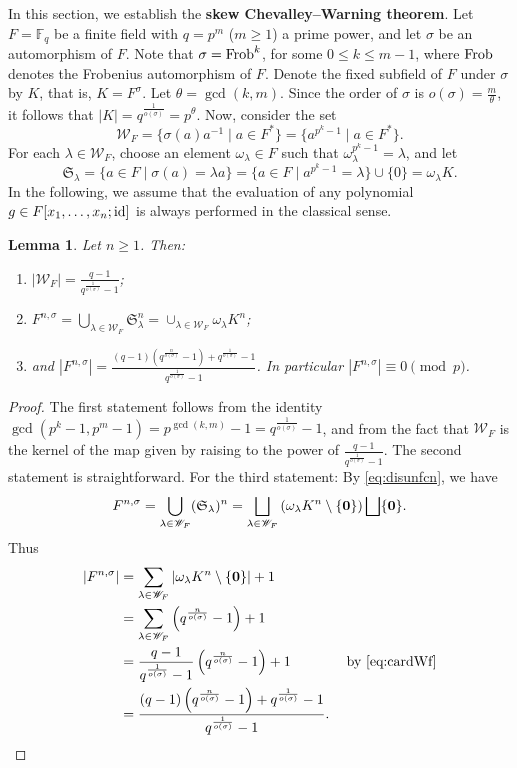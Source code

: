 \documentclass[11pt,reqno]{amsart}
\newtheorem{lem}[thm]{Lemma}
\theoremstyle{definition}
\begin{document}
In this section, we establish the {\bf skew Chevalley--Warning theorem}. Let $F=\mathbb{F}_q$ be a finite field with $q=p^m$ ($m \geq 1$) a prime power, and let $\sigma$ be an automorphism of $F$. Note that $\sigma={\rm Frob}^k$, for some $0 \leq k \leq m-1$, where ${\rm Frob}$ denotes the Frobenius automorphism of $F$.  Denote the fixed subfield of $F$ under $\sigma$ by $K$, that is, $K=F^\sigma$. Let $\theta=\gcd(k,m)$. Since the order of $\sigma$ is $o(\sigma)=\frac{m}{\theta}$, it follows that $|K|=q^{\frac{1}{o(\sigma)}}=p^{\theta}$. Now, consider the set 
$$\mathscr{W}_F=\{\sigma(a)a^{-1} \mid a \in F^*\}=\{a^{p^k-1}\mid a \in F^*\}.$$ 
For each $\lambda \in \mathscr{W}_F$, choose an element $\omega_\lambda \in F$ such that $\omega_\lambda^{p^k-1}=\lambda$, and let 
$$\mathfrak{S}_\lambda=\{a \in F \mid \sigma(a)=\lambda a\}=\{a \in F \mid a^{p^k-1}=\lambda\} \cup \{0\}=\omega_\lambda K.$$
{ In the following, we assume that the evaluation of any polynomial $g \in F[x_1,\dots,x_n;{\rm id}]$ is always performed in the classical sense.}
\begin{lem}\label{lem:carfcn}
Let $n \geq 1$. Then:
\begin{enumerate}
\item $|\mathscr{W}_F|=\frac{q-1}{q^{\frac{1}{o(\sigma)}}-1}$; \label{eq:cardWf}
\item $F^{n,\sigma}=\bigcup_{\lambda \in \mathscr{W}_F}\mathfrak{S}_\lambda ^n =\cup_{\lambda \in \mathscr{W}_F}\omega_\lambda K^n$;\label{eq:disunfcn}
\item and $|F^{n,\sigma}|=\frac{(q-1)\left(q^{\frac{n}{o(\sigma)}}-1\right)+q^{\frac{1}{o(\sigma)}}-1}{q^{\frac{1}{o(\sigma)}}-1}$. In particular $|F^{n,\sigma}| \equiv 0\pmod{p}$.
\end{enumerate}
\end{lem}
\begin{proof}
The first statement follows from the identity $\gcd(p^k-1,p^m-1)=p^{\gcd(k,m)}-1=q^{\frac{1}{o(\sigma)}}-1$, and from the fact that $\mathscr{W}_F$ is the kernel of the map given by raising to the power of $\frac{q-1}{q^{\frac{1}{o(\sigma)}}-1}$. The second statement is straightforward. For the third statement: By \eqref{eq:disunfcn}, we have 
$$F^{n,\sigma}=\bigcup_{\lambda \in \mathscr{W}_F}(\mathfrak{S}_\lambda )^n=\bigsqcup_{\lambda \in \mathscr{W}_F}\left(\omega_\lambda K^n \setminus \{{\bf 0}\}\right) \bigsqcup \{{\bf 0}\}.$$ Thus 
\begin{align*}
|F^{n,\sigma}|&=\sum_{\lambda \in \mathscr{W}_F}|\omega_\lambda K^n\setminus \{{\bf 0}\}|+1\\
       &=\sum_{\lambda \in \mathscr{W}_F}\left(q^{\frac{n}{o(\sigma)}}-1\right)+1\\
       &=
\frac{q-1}{q^{\frac{1}{o(\sigma)}}-1} \left(q^{\frac{n}{o(\sigma)}}-1\right)+1 \quad \quad \quad \quad \textrm{by \eqref{eq:cardWf}}\\
&=\frac{(q-1)\left(q^{\frac{n}{o(\sigma)}}-1\right)+q^{\frac{1}{o(\sigma)}}-1}{q^{\frac{1}{o(\sigma)}}-1}.
\end{align*}
\end{proof}
\end{document}
